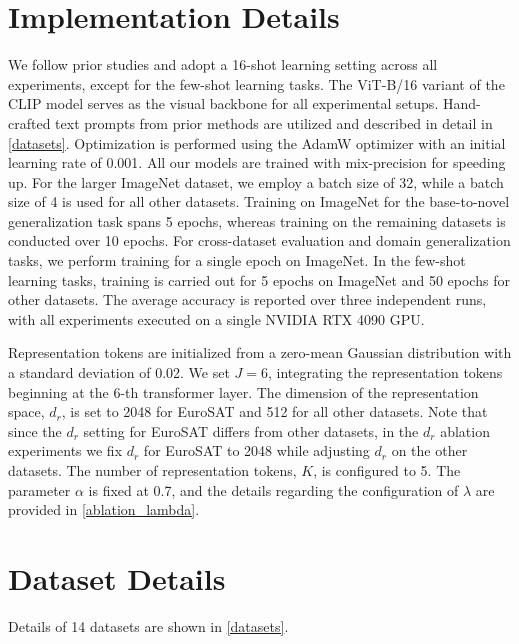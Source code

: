 \clearpage
\appendix
\setcounter{page}{1}
\maketitlesupplementary

\section{Implementation Details}
We follow prior studies\cite{coop, cocoop, prograd, kgcoop, maple, tcp, mma} and adopt a 16-shot learning setting across all experiments, except for the few-shot learning tasks. The ViT-B/16\cite{vit} variant of the CLIP model serves as the visual backbone for all experimental setups. Hand-crafted text prompts from prior methods\cite{clip, coop, tip-adapter} are utilized and described in detail in \cref{datasets}. Optimization is performed using the AdamW optimizer with an initial learning rate of 0.001. All our models are trained with mix-precision for speeding up. For the larger ImageNet dataset, we employ a batch size of 32, while a batch size of 4 is used for all other datasets. Training on ImageNet for the base-to-novel generalization task spans 5 epochs, whereas training on the remaining datasets is conducted over 10 epochs. For cross-dataset evaluation and domain generalization tasks, we perform training for a single epoch on ImageNet. In the few-shot learning tasks, training is carried out for 5 epochs on ImageNet and 50 epochs for other datasets. The average accuracy is reported over three independent runs, with all experiments executed on a single NVIDIA RTX 4090 GPU.

Representation tokens are initialized from a zero-mean Gaussian distribution with a standard deviation of 0.02. We set $J = 6$, integrating the representation tokens beginning at the 6-th transformer layer. The dimension of the representation space, $d_r$, is set to 2048 for EuroSAT and 512 for all other datasets. Note that since the $d_r$ setting for EuroSAT differs from other datasets, in the $d_r$ ablation experiments we fix $d_r$ for EuroSAT to 2048 while adjusting $d_r$ on the other datasets. The number of representation tokens, $K$, is configured to 5. The parameter $\alpha$ is fixed at 0.7, and the details regarding the configuration of $\lambda$ are provided in \cref{ablation_lambda}.



\section{Dataset Details}
Details of 14 datasets are shown in \cref{datasets}.


